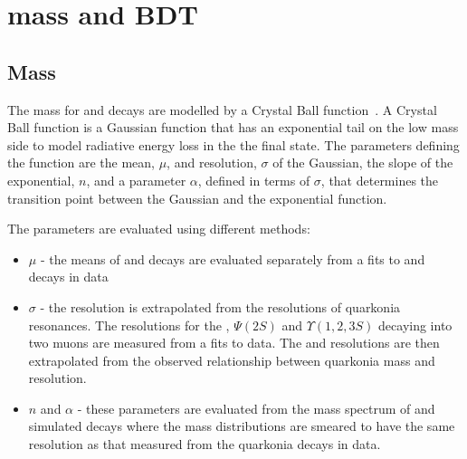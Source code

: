 \section{\bsmumu mass and BDT \pdfs}
\label{sec:signalPdfs}

\subsection{Mass \pdfs}
The mass \pdfs for \bdmumu and \bsmumu decays are modelled by a Crystal Ball function~\cite{Skwarnicki:1986xj}. A Crystal Ball function is a Gaussian function that has an exponential tail on the low mass side to model radiative energy loss in the the final state. The parameters defining the function are the mean, $\mu$, and resolution, $\sigma$ of the Gaussian, the slope of the exponential, $n$, and a parameter $\alpha$, defined in terms of $\sigma$, that determines the transition point between the Gaussian and the exponential function. 

The parameters are evaluated using different methods:
\begin{itemize}
\item $\mu$ - the means of \bd and \bs decays are evaluated separately from a fits to \bdkpi and \bskk decays in data
\item $\sigma$ - the resolution is extrapolated from the resolutions of quarkonia resonances. The resolutions for the \jpsi, $\Psi (2S)$ and $\Upsilon(1, 2, 3S)$ decaying into two muons are measured from a fits to data. The \bd and \bs resolutions are then extrapolated from the observed relationship between quarkonia mass and resolution.
\item $n$ and $\alpha$ - these parameters are evaluated from the mass spectrum of \bdmumu and \bsmumu simulated decays where the mass distributions are smeared to have the same resolution as that measured from the quarkonia decays in data.
\end{itemize}

